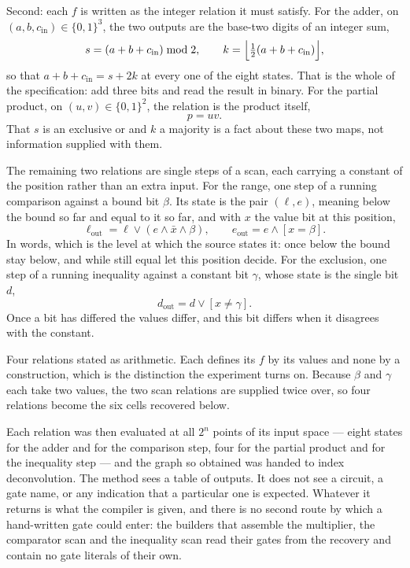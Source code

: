 \documentclass[11pt,a4paper]{article}
\begin{document}
Second: each $f$ is written as the integer relation it must satisfy. For the adder, on
$(a,b,c_{\mathrm{in}})\in\{0,1\}^3$, the two outputs are the base-two digits of
an integer sum,
\begin{equation}\label{eq:adderrel}
s=(a+b+c_{\mathrm{in}})\bmod 2,\qquad
k=\Bigl\lfloor\tfrac{1}{2}(a+b+c_{\mathrm{in}})\Bigr\rfloor,
\end{equation}
so that $a+b+c_{\mathrm{in}}=s+2k$ at every one of the eight states. That is the
whole of the specification: add three bits and read the result in binary. For
the partial product, on $(u,v)\in\{0,1\}^2$, the relation is the product itself,
\begin{equation}\label{eq:pprel}
p=uv .
\end{equation}
That $s$ is an exclusive or and $k$ a majority is a fact about these two maps,
not information supplied with them.

The remaining two relations are single steps of a scan, each carrying a
constant of the position rather than an extra input. For the range, one step of
a running comparison against a bound bit $\beta$. Its state is the pair
$(\ell,e)$, meaning below the bound so far and equal to it so far, and with $x$
the value bit at this position,
\begin{equation}\label{eq:cmprel}
\ell_{\mathrm{out}}=\ell\vee(e\wedge\bar x\wedge\beta),\qquad
e_{\mathrm{out}}=e\wedge[x=\beta].
\end{equation}
In words, which is the level at which the source states it: once below the
bound stay below, and while still equal let this position decide. For the
exclusion, one step of a running inequality against a constant bit $\gamma$,
whose state is the single bit $d$,
\begin{equation}\label{eq:diffrel}
d_{\mathrm{out}}=d\vee[x\ne\gamma].
\end{equation}
Once a bit has differed the values differ, and this bit differs when it
disagrees with the constant.

Four relations stated as arithmetic. Each defines
its $f$ by its values and none by a construction, which is the distinction the
experiment turns on. Because $\beta$ and $\gamma$ each take two values, the two
scan relations are supplied twice over, so four relations become the six cells
recovered below.

Each relation was then evaluated at all $2^n$ points of its input space --- eight
states for the adder and for the comparison step, four for the partial product
and for the inequality step --- and the graph so obtained was handed to index
deconvolution. The method sees a table of outputs. It does not see a circuit, a
gate name, or any indication that a particular one is expected. Whatever it
returns is what the compiler is given, and there is no second route by which a
hand-written gate could enter: the builders that assemble the multiplier, the
comparator scan and the inequality scan read their gates from the recovery and
contain no gate literals of their own.
\end{document}
